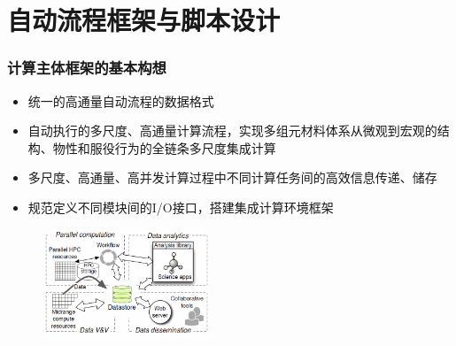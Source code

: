 \documentclass[cjk,slidestop,handout,compress,mathserif,blue]{beamer}	%
\begin{document}
\small
\section{自动流程框架与脚本设计}
\frame
{
	\frametitle{计算主体框架的基本构想}
	\begin{itemize}
		\item 统一的高通量自动流程的数据格式
		\item 自动执行的多尺度、高通量计算流程，实现多组元材料体系从微观到宏观的结构、物性和服役行为的全链条多尺度集成计算
		\item 多尺度、高通量、高并发计算过程中不同计算任务间的高效信息传递、储存
		\item 规范定义不同模块间的I/O接口，搭建集成计算环境框架
	\end{itemize}
\begin{figure}[h!]
\centering
\vspace*{-0.2in}
\includegraphics[height=1.3in,width=2.0in,viewport=0 0 680 460,clip]{Figures/Parallel_computation.png}
\caption{\fontsize{5.2pt}{2.5pt}}%
\label{parallel_computation}
\end{figure} 
}
\end{document}
